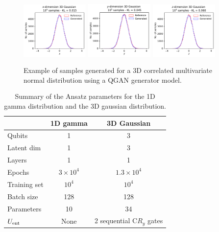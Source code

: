 \documentclass[twocolumn,preprintnumbers,superscriptaddress]{revtex4-2}
\begin{document}
\begin{figure}

  \includegraphics[width=0.3\textwidth]{plots/3Dgaussian_posdef/1-distribution_3dgaussian_100k.pdf}%
  \includegraphics[width=0.3\textwidth]{plots/3Dgaussian_posdef/2-distribution_3dgaussian_100k.pdf}%
  \includegraphics[width=0.3\textwidth]{plots/3Dgaussian_posdef/3-distribution_3dgaussian_100k.pdf}

  \caption{\label{fig:3dgauss}Example of samples generated for a 3D correlated
    multivariate normal distribution using a QGAN generator model.}
\end{figure}

\begin{table}
  \begin{tabular}{l|c|c}
     & {\bf 1D gamma} & {\bf 3D Gaussian} \tabularnewline
    \hline
    Qubits & 1 & 3 \tabularnewline
    Latent dim & 1 & 3 \tabularnewline
    Layers & 1 & 1 \tabularnewline
    Epochs & $3\times10^4$ & $1.3\times10^4$ \tabularnewline
    Training set & $10^4$ & $10^4$ \tabularnewline
    Batch size & 128 & 128 \tabularnewline
    Parameters & 10 & 34 \tabularnewline
    $U_{\rm ent}$ & None & 2 sequential C$R_y$ gates \tabularnewline
    \hline
  \end{tabular}

  \caption{\label{table:summary} Summary of the Ansatz parameters for the 1D
  gamma distribution and the 3D gaussian distribution.}

\end{table}
\end{document}
